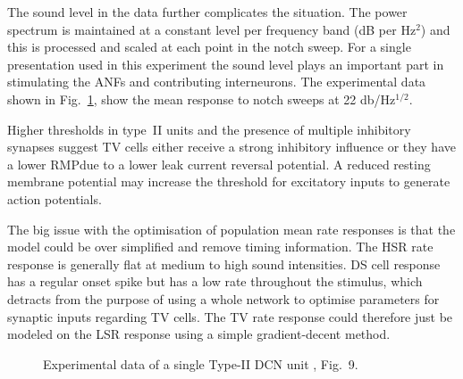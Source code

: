 \smallskip{}

The sound level in the \citet{ReissYoung:2005} data further complicates the
situation.  The power spectrum is maintained at a constant level per frequency
band (dB per Hz$^2$) and this is processed and scaled at each point in the notch
sweep.  For a single presentation used in this experiment the sound level plays
an important part in stimulating the ANFs and contributing interneurons.  The
experimental data shown in Fig.~\ref{fig:TVReissFig9}, show the mean response to
notch sweeps at 22 db/Hz$^{1/2}$.

\smallskip{}

Higher thresholds in type~II \DCN units \citep{SpirouDavisEtAl:1999} and the
presence of multiple inhibitory synapses \citep{Alibardi:2006} suggest TV cells
either receive a strong inhibitory influence or they have a lower RMP\@ due to a
lower leak current reversal potential. A reduced resting membrane potential may
increase the threshold for excitatory inputs to generate action potentials.


\smallskip{}

The big issue with the optimisation of population mean rate responses is that
the model could be over simplified and remove timing information.  The HSR rate
response is generally flat at medium to high sound intensities. DS cell response
has a regular onset spike but has a low rate throughout the stimulus, which
detracts from the purpose of using a whole network to optimise parameters for
synaptic inputs regarding TV cells.  The TV rate response could therefore just
be modeled on the LSR response using a simple gradient-decent
method. 
 
\smallskip{} 


\begin{figure}[htb]
  \centering
  \caption{Experimental data of a single Type-II DCN unit
    \citep{ReissYoung:2005}, Fig.~9.}
  \label{fig:TVReissFig9}
\end{figure}


